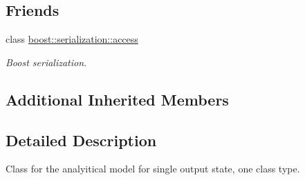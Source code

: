 \subsection*{Friends}
\begin{DoxyCompactItemize}
\item 
class \hyperlink{class_go_s_u_m_1_1_c_one_class_s_a_m_ac98d07dd8f7b70e16ccb9a01abf56b9c}{boost\-::serialization\-::access}
\begin{DoxyCompactList}\small\item\em Boost serialization. \end{DoxyCompactList}\end{DoxyCompactItemize}
\subsection*{Additional Inherited Members}


\subsection{Detailed Description}
Class for the analyitical model for single output state, one class type. 

